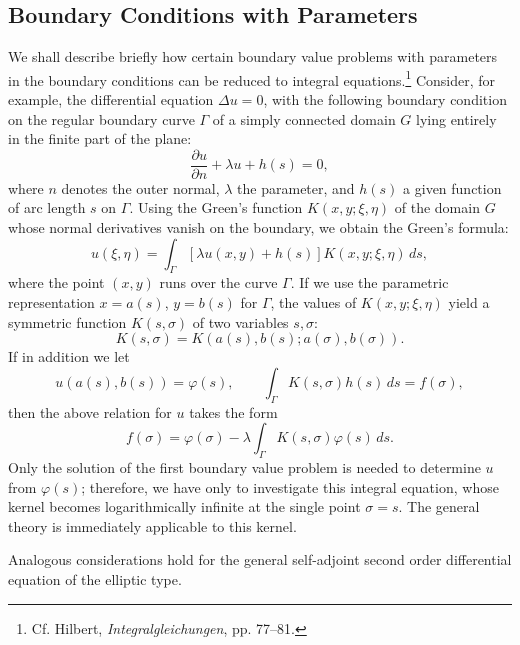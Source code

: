 \subsection{Boundary Conditions with Parameters}
We shall describe briefly how certain boundary value problems with parameters in the boundary conditions can be reduced to integral equations.\footnote{Cf. Hilbert, \emph{Integralgleichungen}, pp. 77--81.} Consider, for example, the differential equation $\Delta u=0$, with the following boundary condition on the regular boundary curve $\Gamma$ of a simply connected domain $G$ lying entirely in the finite part of the plane:
\[
\frac{\partial u}{\partial n}+\lambda u+h(s)=0,
\]
where $n$ denotes the outer normal, $\lambda$ the parameter, and $h(s)$ a given function of arc length $s$ on $\Gamma$. Using the Green's function $K(x,y;\xi,\eta)$ of the domain $G$ whose normal derivatives vanish on the boundary, we obtain the Green's formula:
\[
u(\xi,\eta)=\int_\Gamma[\lambda u(x,y)+h(s)]K(x,y;\xi,\eta)\,ds,
\]
where the point $(x,y)$ runs over the curve $\Gamma$. If we use the parametric representation $x=a(s)$, $y=b(s)$ for $\Gamma$, the values of $K(x,y;\xi,\eta)$ yield a symmetric function $K(s,\sigma)$ of two variables $s,\sigma$:
\[
K(s,\sigma)=K(a(s),b(s);a(\sigma),b(\sigma)).
\]
If in addition we let
\[
u(a(s),b(s))=\varphi(s),
\qquad
\int_\Gamma K(s,\sigma)h(s)\,ds=f(\sigma),
\]
then the above relation for $u$ takes the form
\[
f(\sigma)=\varphi(\sigma)-\lambda\int_\Gamma K(s,\sigma)\varphi(s)\,ds.
\]
Only the solution of the first boundary value problem is needed to determine $u$ from $\varphi(s)$; therefore, we have only to investigate this integral equation, whose kernel becomes logarithmically infinite at the single point $\sigma=s$. The general theory is immediately applicable to this kernel.

Analogous considerations hold for the general self-adjoint second order differential equation of the elliptic type.

